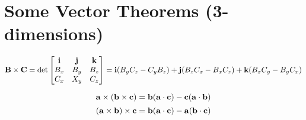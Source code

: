 \section{Some Vector Theorems (3-dimensions)}
\begin{align*}
{\bf B} \times {\bf C} = 
\det\begin{bmatrix}
{\bf i} & {\bf j} & {\bf k}\\
B_x & B_y & B_z  \\
C_x& X_y & C_z \\
\end{bmatrix} = {\bf i}(B_y C_z - C_y B_z) + {\bf j}(B_z C_x - B_x C_z) + {\bf k}(B_xC_y-B_yC_x) 
\end{align*}

\begin{theorem}
\[ {\bf a} \times ({\bf b} \times {\bf c}) = {\bf b}({\bf a}\cdot {\bf c}) - {\bf c}({\bf a}\cdot {\bf b}) \]
\[ ({\bf a} \times {\bf b}) \times {\bf c} = {\bf b}({\bf a}\cdot {\bf c}) - {\bf a}({\bf b}\cdot {\bf c}) \]
\end{theorem}

